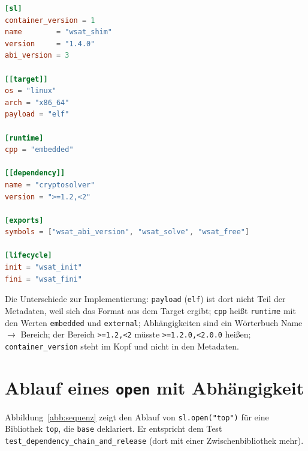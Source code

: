 \begin{lstlisting}[language=TOML, caption={Metadatenskizze (\texttt{proposal.md}, Anhang~A, gekürzt).}, label={lst:toml}]
[sl]
container_version = 1
name        = "wsat_shim"
version     = "1.4.0"
abi_version = 3

[[target]]
os = "linux"
arch = "x86_64"
payload = "elf"

[runtime]
cpp = "embedded"

[[dependency]]
name = "cryptosolver"
version = ">=1.2,<2"

[exports]
symbols = ["wsat_abi_version", "wsat_solve", "wsat_free"]

[lifecycle]
init = "wsat_init"
fini = "wsat_fini"
\end{lstlisting}

Die Unterschiede zur Implementierung: \texttt{payload} (\texttt{elf}) ist dort nicht Teil der Metadaten, weil sich das Format aus dem Target ergibt; \texttt{cpp} heißt \texttt{runtime} mit den Werten \texttt{embedded} und \texttt{external}; Abhängigkeiten sind ein Wörterbuch Name $\to$ Bereich; der Bereich \texttt{>=1.2,<2} müsste \texttt{>=1.2.0,<2.0.0} heißen; \texttt{container\_version} steht im Kopf und nicht in den Metadaten.

\section{Ablauf eines \texttt{open} mit Abhängigkeit}

Abbildung~\ref{abb:sequenz} zeigt den Ablauf von \texttt{sl.open("top")} für eine Bibliothek \texttt{top}, die \texttt{base} deklariert. Er entspricht dem Test \texttt{test\_dependency\_chain\_and\_release} (dort mit einer Zwischenbibliothek mehr).

